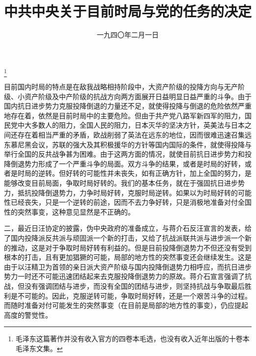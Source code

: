 
\title{中共中央关于目前时局与党的任务的决定}
\date{一九四〇年二月一日}
\thanks{毛泽东这篇著作并没有收入官方的四卷本毛选，也没有收入近年出版的十卷本毛泽东文集。}
\maketitle



目前国内时局的特点是在敌我战略相持阶段中，大资产阶级的投降方向与无产阶级、小资产阶级及中产阶级的抗战方向两方面展开日益明显日益严重的斗争。由于国内抗日进步势力克服投降倒退的力量还不足，就使得投降与倒退的危险依然严重地存在着，依然是目前时局中的主要危险。但由于共产党八路军新四军的阻力，国民党中大多数人的阻力，全国人民的阻力，日本灭华的坚决方针，英美法与日本之间还存在着相当严重的矛盾，欧战削弱了英法在远东的地位，因而很难迅速召集远东慕尼黑会议，苏联的强大及其积极援华的方针等国内国际的条件，就使得投降与举行全国的反共战争甚为困难。由于这两方面的情况，就使目前抗日进步势力和投降倒退势力形成了一个严重斗争的局面。双方斗争的结果，或者是时局的好转，或者是时局的逆转。但好转的可能性并未丧失，如有正确方针，加上全国的努力，是能够改变目前局面，争取时局好转的。我们的基本任务，就在于强固抗日进步势力，抵抗投降倒退势力，力争时局好转，克服时局逆转。如果以为时局好转的可能性已经丧失，只是一个逆转的前途，因而不去力争好转，只是消极地准备对付全国性的突然事变，这种意见显然是不正确的。

二，最近日汪协定的披露，伪中央政府的准备成立，与蒋介石反汪宣言的发表，给了国内投降派反共派与顽固派一个新的打击，又给了抗战派联共派与进步派一个新的推动，这是对于争取时局好转有利益的。但是目前投降倒退势力不但还没有受到根本的打击，且有更加猖獗的可能，局部的地方性的突然事变还会继续发生。这是由于以汪精卫为首领的亲日派大资产阶级与国内投降倒退势力相呼应，而抗日进步势力一时还不可能迅速团结起来去克服投降倒退势力的原故。蒋介石宣言强调了抗战，但没有强调团结与进步，而没有全国的团结与进步，则坚持抗战与争取最后胜利是不可能的。因此，克服逆转可能，争取时局好转，还是一个艰苦斗争的过程。而随时准备对付可能发生的突然事变（在目前是局部的地方性的事变），仍应提起高度的警觉性。

